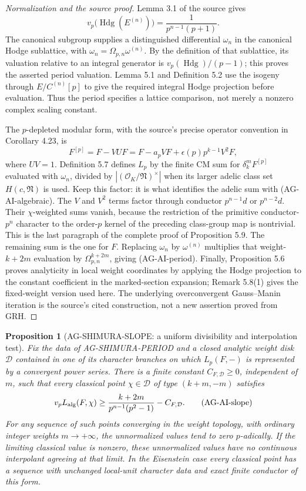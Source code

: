 \documentclass[11pt,a4paper]{article}
\newtheorem{proposition}{Proposition}
\begin{document}
\begin{proof}[Normalization and the source proof]
Lemma 3.1 of the source gives
\[
 v_p\bigl(\operatorname{Hdg}(E^{(n)})\bigr)
       =\frac1{p^{n-1}(p+1)}.
\]
The canonical subgroup supplies a distinguished differential
$\omega_n$ in the canonical Hodge sublattice, with
$\omega_n=\Omega_{p,n}\omega^{(n)}$.  By the definition of that
sublattice, its valuation relative to an integral generator is
$v_p(\operatorname{Hdg})/(p-1)$; this proves the asserted period
valuation.  Lemma 5.1 and Definition 5.2 use the isogeny through
$E/C^{(n)}[p]$ to give the required integral Hodge projection before
evaluation.  Thus the period specifies a lattice comparison, not
merely a nonzero complex scaling constant.

The $p$-depleted modular form, with the source's precise operator
convention in Corollary 4.23, is
\[
 F^{[p]}=F-VUF
       =F-a_pVF+\epsilon(p)p^{k-1}V^2F,
\]
where $UV=1$.  Definition 5.7 defines $L_p$ by the finite CM sum
for $\delta_k^mF^{[p]}$ evaluated with $\omega_n$, divided by
$| (\mathcal O_K/\mathfrak N)^\times |$ when its larger adelic
class set $H(c,\mathfrak N)$ is used.  Keep this factor: it is what
identifies the adelic sum with (AG-AI-algebraic).
The $V$ and $V^2$ terms factor through conductor $p^{n-1}d$ or
$p^{n-2}d$.  Their $\chi$-weighted sums vanish, because the restriction
of the primitive conductor-$p^n$ character to the order-$p$ kernel
of the preceding class-group map is nontrivial.  This is the last
paragraph of the complete proof of Proposition 5.9.  The remaining
sum is the one for $F$.  Replacing $\omega_n$ by
$\omega^{(n)}$ multiplies that weight-$k+2m$ evaluation by
$\Omega_{p,n}^{k+2m}$, giving (AG-AI-period).
Finally, Proposition 5.6 proves analyticity in local weight
coordinates by applying the Hodge projection to the constant
coefficient in the marked-section expansion; Remark 5.8(1) gives
the fixed-weight version used here.  The underlying overconvergent
Gauss--Manin iteration is the source's cited construction, not a
new assertion proved from GRH.
\end{proof}

\begin{proposition}[AG-SHIMURA-SLOPE: a uniform divisibility and interpolation test]
Fix the data of AG-SHIMURA-PERIOD and a closed analytic weight disk
$\mathcal D$ contained in one of its character branches on which
$L_p(F,-)$ is represented by a convergent power series.  There is a
finite constant $C_{F,\mathcal D}\geq0$, independent of $m$, such
that every classical point $\chi\in\mathcal D$ of type $(k+m,-m)$
satisfies
\[
 v_p L_{\rm alg}(F,\chi)
       \geq\frac{k+2m}{p^{n-1}(p^2-1)}-C_{F,\mathcal D}.  \tag{AG-AI-slope}
\]
For any sequence of such points converging in the weight topology,
with ordinary integer weights $m\longrightarrow+\infty$, the
unnormalized values tend to zero $p$-adically.  If the limiting
classical value is nonzero, these unnormalized values have no
continuous interpolant agreeing at that limit.  In the Eisenstein
case every classical point has a sequence with unchanged local-unit character data
and exact finite conductor of this form.
\end{proposition}
\end{document}
